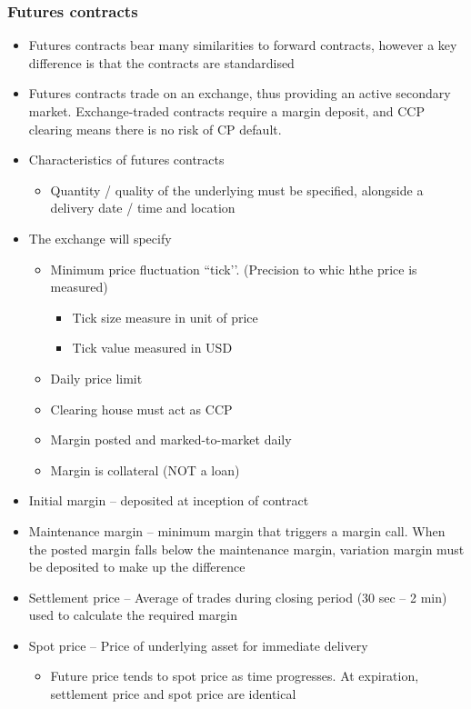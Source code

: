 \documentclass[../notes_compiled.tex]{subfiles}
\begin{document}
\subsubsection{Futures contracts}
\begin{itemize}
\item Futures contracts bear many similarities to forward contracts, however a key difference is that the contracts are standardised
\item Futures contracts trade on an exchange, thus providing an active secondary market. Exchange-traded contracts require a margin deposit, and CCP clearing means there is no risk of CP default.
\item Characteristics of futures contracts
\begin{itemize}
\item Quantity / quality of the underlying must be specified, alongside a delivery date / time and location
\end{itemize}
\item The exchange will specify
\begin{itemize}
\item Minimum price fluctuation ``tick’’. (Precision to whic hthe price is measured)
\begin{itemize}
\item Tick size measure in unit of price
\item Tick value measured in USD
\end{itemize}
\item Daily price limit
\item Clearing house must act as CCP
\item Margin posted and marked-to-market daily
\item Margin is collateral (NOT a loan)
\end{itemize}
\item Initial margin -- deposited at inception of contract
\item Maintenance margin -- minimum margin that triggers a margin call. When the posted margin falls below the maintenance margin, variation margin must be deposited to make up the difference
\item Settlement price -- Average of trades during closing period (30 sec -- 2 min) used to calculate the required margin
\item Spot price -- Price of underlying asset for immediate delivery
\begin{itemize}
\item Future price tends to spot price as time progresses. At expiration, settlement price and spot price are identical
\end{itemize}
\end{itemize}
\end{document}
